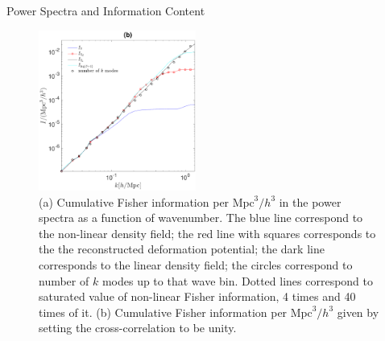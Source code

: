 \begin{section}{Power Spectra and Information Content}
\begin{figure}
  \includegraphics[width=0.46\textwidth]{fisher_best_analysis-crop.pdf}
\centering
   \caption{(a) Cumulative Fisher information per $\mathrm{Mpc}^3/h^3$ in the power spectra 
as a function of wavenumber. The blue line correspond to the non-linear density field; 
the red line with squares corresponds to the the reconstructed deformation 
potential; the dark line corresponds to the linear density field; the circles correspond to number 
of $k$ modes up to that wave bin. Dotted lines correspond to saturated value of 
non-linear Fisher information, 4 times and 40 times of it. (b) Cumulative Fisher information 
per $\mathrm{Mpc}^3/h^3$ given by setting the cross-correlation to be unity.}
  \label{fig:fisherinfo}

\end{figure}

\end{section}
